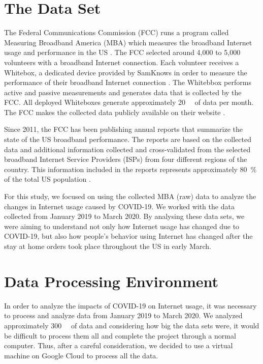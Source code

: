 \documentclass[conference]{IEEEtran}
\begin{document}
\section{The Data Set}
\label{sec:the-data-set}

The Federal Communications Commission (FCC) runs a program called Measuring Broadband America (MBA) which measures the broadband Internet usage and performance in the US \cite{mba}. The FCC selected around 4,000 to 5,000 volunteers with a broadband Internet connection. Each volunteer receives a Whitebox, a dedicated device provided by SamKnows in order to measure the performance of their broadband Internet connection \cite{sam}. The Whitebbox performs active and passive measurements and generates data that is collected by the FCC. All deployed Whiteboxes generate approximately \SI{20}{\giga\byte} of data per month. The FCC makes the collected data publicly available on their website \cite{data}.

Since 2011, the FCC has been publishing annual reports that summarize the state of the US broadband performance. The reports are based on the collected data and additional information collected and cross-validated from the selected broadband Internet Service Providers (ISPs) from four different regions of the country. This information included in the reports represents approximately \SI{80}{\percent} of the total US population \cite{report}.

For this study, we focused on using the collected MBA (raw) data to analyze the changes in  Internet usage caused by COVID-19. We worked with the data collected from January 2019 to March 2020. By analysing these data sets, we were aiming to understand not only how Internet usage has changed due to COVID-19, but also how people's behavior using  Internet has changed after the stay at home orders took place throughout the US in early March. 

\section{Data Processing Environment}
\label{sec:data-processing-environment}

In order to analyze the impacts of COVID-19 on Internet usage, it was necessary to process and analyze data from January 2019 to March 2020. We analyzed approximately \SI{300}{\giga\byte} of data and considering how big the data sets were, it would be difficult to process them all and complete the project through a normal computer. Thus, after a careful consideration, we decided to use a virtual machine on Google Cloud to process all the data.  
\end{document}
